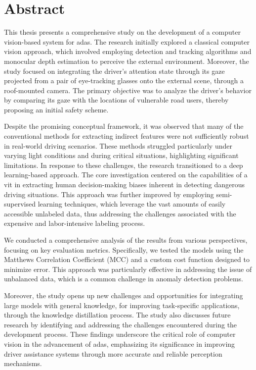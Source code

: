 \thispagestyle{empty}
\section*{Abstract}
\vspace{0.5cm}
This thesis presents a comprehensive study on the development of a computer 
vision-based system for \acf{adas}. The research 
initially explored a classical computer vision approach, which involved 
employing detection and tracking algorithms and monocular depth estimation
to perceive the external environment. Moreover, the study focused on 
integrating the driver’s attention state through its gaze projected from a pair 
of eye-tracking glasses onto the external scene, through a roof-mounted camera.
The primary objective was to analyze the driver's behavior by comparing 
its gaze with the locations of vulnerable road users, thereby proposing 
an initial safety scheme.

Despite the promising conceptual framework, it was observed that many of the 
conventional methods for extracting indirect features were not sufficiently 
robust in real-world driving scenarios. These methods struggled particularly 
under varying light conditions and during critical situations, highlighting 
significant limitations. In response to these challenges, the research 
transitioned to a deep learning-based approach. The core investigation centered 
on the capabilities of a \acf{vit} in extracting human decision-making 
biases inherent in detecting dangerous driving situations.
This approach was further improved by 
employing semi-supervised learning techniques, which leverage the 
vast amounts of easily accessible unlabeled data, thus 
addressing the challenges associated with the expensive and labor-intensive 
labeling process.

We conducted a comprehensive analysis of the results from various perspectives, 
focusing on key evaluation metrics. Specifically, we tested the models using the 
Matthews Correlation Coefficient (MCC) and a custom cost function designed to 
minimize error. This approach was particularly effective in addressing the issue 
of unbalanced data, which is a common challenge in anomaly detection problems.

Moreover, the study opens up new challenges and opportunities for integrating 
large models with general knowledge, for improving task-specific applications, 
through the knowledge distillation process.
The study also discusses future 
research by identifying and addressing the challenges encountered during the 
development process. These findings underscore the critical role of computer 
vision in the advancement of \acs{adas}, emphasizing its significance in improving 
driver assistance systems through more accurate and reliable perception 
mechanisms.


\afterpage{\blankpage}
